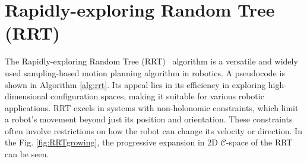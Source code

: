 \documentclass{ctuthesis}
\begin{document}
\section{Rapidly-exploring Random Tree (RRT)} 
The Rapidly-exploring Random Tree (RRT)~\cite{lavalle1998rapidly} algorithm 
is a versatile and widely used sampling-based motion planning algorithm in robotics. 
A pseudocode is shown in Algorithm \hyperref[alg:rrt]{\ref*{alg:rrt}}.
Its appeal lies in its efficiency in exploring high-dimensional configuration spaces, 
making it suitable for various robotic applications. 
RRT excels in systems with non-holonomic constraints, 
which limit a robot's movement beyond just its position and orientation. 
These constraints often involve restrictions on how the robot can change its velocity or direction. 
In the Fig. \hyperref[fig:RRTgrowing]{\ref*{fig:RRTgrowing}}, 
the progressive expansion in 2D $\mathcal{C}$-space of the RRT can be seen.
\end{document}
